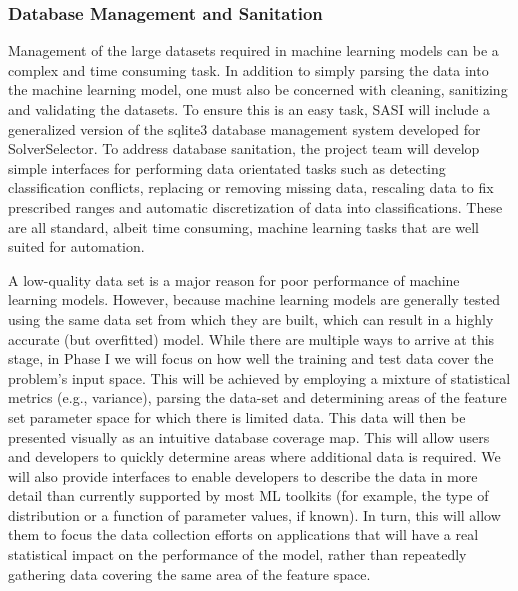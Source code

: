 \subsubsection{Database Management and Sanitation} Management of the large datasets required in machine learning models can be a complex and time consuming task. In addition to simply parsing the data into the machine learning model, one must also be concerned with cleaning, sanitizing and validating the datasets. To ensure this is an easy task, SASI will include a generalized version of the sqlite3 database management system developed for SolverSelector. To address database sanitation, the project team will develop simple interfaces for performing data orientated tasks such as detecting classification conflicts, replacing or removing missing data, rescaling data to fix prescribed ranges and automatic discretization of data into classifications. These are all standard, albeit time consuming, machine learning tasks that are well suited for automation. 

A low-quality data set is a major reason for poor performance of machine learning models. However, because machine learning models are generally tested using the same data set from which they are built, which can result in a highly accurate (but overfitted) model.  While there are multiple ways to arrive at this stage, in Phase I we will focus on how well the training and test data cover the problem's input space.  This will be achieved by employing a mixture of statistical metrics (e.g., variance), parsing the data-set and determining areas of the feature set parameter space for which there is limited data. This data will then be presented visually as an intuitive database coverage map. This will allow users and developers to quickly determine areas where additional data is required. We will also provide interfaces to enable developers to describe the data in more detail than currently supported by most ML toolkits (for example, the type of distribution or a function of parameter values, if known). In turn, this will allow them to focus the data collection efforts on applications that will have a real statistical impact on the performance of the model, rather than repeatedly gathering data covering the same area of the feature space. 

